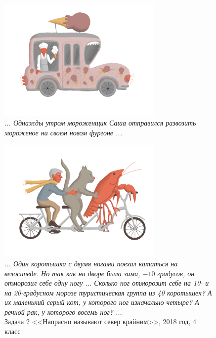 \documentclass[10pt]{scrbook} \usepackage{modules/nonstahp_book}
\begin{document}
\begin{figure} \begin{center}
	\includegraphics[width=8cm]{figures/color/10}
	\caption{
             {\itshape ... Однажды утром мороженщик Саша отправился развозить мороженое 
             на своем новом фургоне ...}\medskip\\
             }
\end{center} \end{figure}


\begin{figure} \begin{center}
	\includegraphics[width=8cm]{figures/color/11}
	\caption{
             {\itshape ... Один коротышка с двумя ногами поехал кататься на велосипеде. 
             Но так как на дворе была зима, $-10$ градусов, он отморозил себе одну ногу ...
             Сколько ног отморозит себе на 10- и на 20-градусном морозе туристическая группа из 
             40 коротышек? А их маленький серый кот, у которого ног изначально четыре? 
             А речной рак, у которого восемь ног? ...}\\
             {Задача 2 <<Напрасно называют север крайним>>, 2018 год, 4 класс}}
\end{center} \end{figure}
\end{document}
